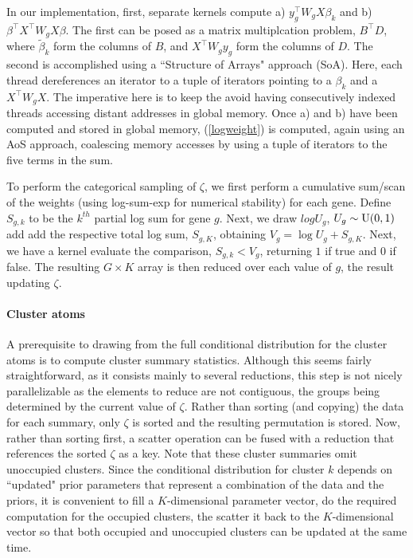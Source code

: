 In our implementation, first, separate kernels compute a) $y_g^\top W_g X \beta_k$ and b) $\beta^\top X^\top W_g X \beta$. The first can be posed as a matrix multiplcation problem, $B^\top D$, where $\tilde{\beta}_k$ form the columns of $B$, and $X^\top W_g y_g$ form the columns of $D$. The second is accomplished using a ``Structure of Arrays" approach (SoA). Here, each thread dereferences an iterator to a tuple of iterators pointing to a $\beta_k$ and a $X^\top W_g X$. The imperative here is to keep the avoid having consecutively indexed threads accessing distant addresses in global memory. Once a) and b) have been computed and stored in global memory, (\ref{logweight}) is computed, again using an AoS approach, coalescing memory accesses by using a tuple of iterators to the five terms in the sum.

To perform the categorical sampling of $\zeta$, we first perform a cumulative sum/scan of the weights (using log-sum-exp for numerical stability) for each gene. Define $S_{g,k}$ to be the $k^{th}$ partial log sum for gene $g$. Next, we draw $log U_g$, $U_g \sim \operatorname{U}(0,1)$ add add the respective total log sum, $S_{g,K}$, obtaining $V_g = \log U_g + S_{g,K}$. Next, we have a kernel evaluate the comparison, $S_{g,k}<V_g$, returning $1$ if true and $0$ if false. The resulting $G\times K$ array is then reduced over each value of $g$, the result updating $\zeta$.

\paragraph{Cluster atoms}
A prerequisite to drawing from the full conditional distribution for the cluster atoms is to compute cluster summary statistics. Although this seems fairly straightforward, as it consists mainly to several reductions, this step is not nicely parallelizable as the elements to reduce are not contiguous, the groups being determined by the current value of $\zeta$. Rather than sorting (and copying) the data for each summary, only $\zeta$ is sorted and the resulting permutation is stored. Now, rather than sorting first, a scatter operation can be fused with a reduction that references the sorted $\zeta$ as a key. Note that these cluster summaries omit unoccupied clusters. Since the conditional distribution for cluster $k$ depends on ``updated" prior parameters that represent a combination of the data and the priors, it is convenient to fill a $K$-dimensional parameter vector, do the required computation for the occupied clusters, the scatter it back to the $K$-dimensional vector so that both occupied and unoccupied clusters can be updated at the same time.

